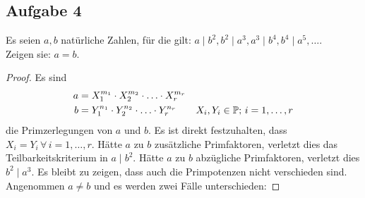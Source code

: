 \subsection{Aufgabe 4}
Es seien $a, b$ natürliche Zahlen, für die gilt:
$a \mid b^2, b^2 \mid a^3, a^3 \mid b^4, b^4 \mid a^5, \dots$.\\
Zeigen sie: $a = b$.
\begin{proof}
  Es sind
  \begin{align*}
    a & = X_1^{m_1} \cdot X_2^{m_2} \cdot \ldots \cdot X_r^{m_r}                                             \\
    b & = Y_1^{n_1} \cdot Y_2^{n_2} \cdot \ldots \cdot Y_r^{n_r} \qquad X_i,Y_i \in \mathbb{P}{};\,i = 1,\dotsc,r
  \end{align*}
  die Primzerlegungen von $a$ und $b$. Es ist direkt festzuhalten, dass $X_i = Y_i\,\forall\,i = 1,\dotsc,r$.
  Hätte $a$ zu $b$ zusätzliche Primfaktoren, verletzt dies das Teilbarkeitskriterium in $a \mid b^2$.
  Hätte $a$ zu $b$ abzügliche Primfaktoren, verletzt dies $b^2 \mid a^3$.
  Es bleibt zu zeigen, dass auch die Primpotenzen nicht verschieden sind.
  Angenommen $a \neq b$ und es werden zwei Fälle unterschieden:


\end{proof}
